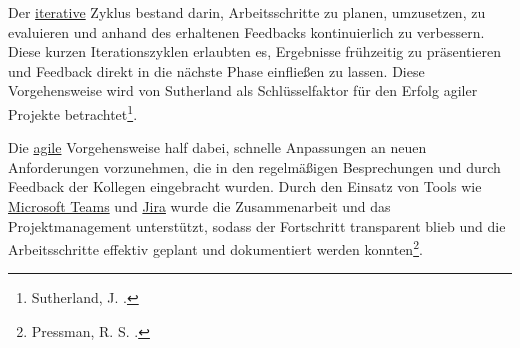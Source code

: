 Der \hyperlink{iterativ}{\textcolor{AOBlau}{iterative}} Zyklus bestand darin, Arbeitsschritte zu planen, umzusetzen, zu evaluieren und anhand des erhaltenen Feedbacks kontinuierlich zu verbessern. Diese kurzen Iterationszyklen erlaubten es, Ergebnisse frühzeitig zu präsentieren und Feedback direkt in die nächste Phase einfließen zu lassen. Diese Vorgehensweise wird von Sutherland als Schlüsselfaktor für den Erfolg agiler Projekte betrachtet\footnote{Sutherland, J. \cite{Sutherland2014}.}.

Die \hyperlink{agil}{\textcolor{AOBlau}{agile}} Vorgehensweise half dabei, schnelle Anpassungen an neuen Anforderungen vorzunehmen, die in den regelmäßigen Besprechungen und durch Feedback der Kollegen eingebracht wurden. Durch den Einsatz von Tools wie \hyperlink{MicrosoftTeams}{\textcolor{AOBlau}{Microsoft Teams}} und \hyperlink{Jira}{\textcolor{AOBlau}{Jira}} wurde die Zusammenarbeit und das Projektmanagement unterstützt, sodass der Fortschritt transparent blieb und die Arbeitsschritte effektiv geplant und dokumentiert werden konnten\footnote{Pressman, R. S. \cite{Pressman2014}.}.
